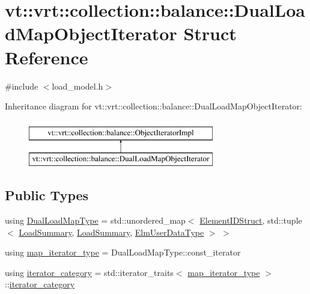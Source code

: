 \hypertarget{structvt_1_1vrt_1_1collection_1_1balance_1_1_dual_load_map_object_iterator}{}\section{vt\+:\+:vrt\+:\+:collection\+:\+:balance\+:\+:Dual\+Load\+Map\+Object\+Iterator Struct Reference}
\label{structvt_1_1vrt_1_1collection_1_1balance_1_1_dual_load_map_object_iterator}


{\ttfamily \#include $<$load\+\_\+model.\+h$>$}

Inheritance diagram for vt\+:\+:vrt\+:\+:collection\+:\+:balance\+:\+:Dual\+Load\+Map\+Object\+Iterator\+:\begin{figure}[H]
\begin{center}
\leavevmode
\includegraphics[height=2.000000cm]{structvt_1_1vrt_1_1collection_1_1balance_1_1_dual_load_map_object_iterator}
\end{center}
\end{figure}
\subsection*{Public Types}
\begin{DoxyCompactItemize}
\item 
using \hyperlink{structvt_1_1vrt_1_1collection_1_1balance_1_1_dual_load_map_object_iterator_a73ef88ce9e6fa24ee9eacc749ef72d03}{Dual\+Load\+Map\+Type} = std\+::unordered\+\_\+map$<$ \hyperlink{namespacevt_1_1vrt_1_1collection_1_1balance_a9f5b53fafb270212279a4757d2c4cd28}{Element\+I\+D\+Struct}, std\+::tuple$<$ \hyperlink{structvt_1_1vrt_1_1collection_1_1balance_1_1_load_summary}{Load\+Summary}, \hyperlink{structvt_1_1vrt_1_1collection_1_1balance_1_1_load_summary}{Load\+Summary}, \hyperlink{namespacevt_1_1vrt_1_1collection_1_1balance_abf9eea0f4c24e41036ab844025e7d4c8}{Elm\+User\+Data\+Type} $>$ $>$
\item 
using \hyperlink{structvt_1_1vrt_1_1collection_1_1balance_1_1_dual_load_map_object_iterator_a86bac54b4dc71af6b0a7cf5aa7ced433}{map\+\_\+iterator\+\_\+type} = Dual\+Load\+Map\+Type\+::const\+\_\+iterator
\item 
using \hyperlink{structvt_1_1vrt_1_1collection_1_1balance_1_1_dual_load_map_object_iterator_a34d41afa8def298d663b106eee78dddf}{iterator\+\_\+category} = std\+::iterator\+\_\+traits$<$ \hyperlink{structvt_1_1vrt_1_1collection_1_1balance_1_1_dual_load_map_object_iterator_a86bac54b4dc71af6b0a7cf5aa7ced433}{map\+\_\+iterator\+\_\+type} $>$\+::\hyperlink{structvt_1_1vrt_1_1collection_1_1balance_1_1_dual_load_map_object_iterator_a34d41afa8def298d663b106eee78dddf}{iterator\+\_\+category}
\end{DoxyCompactItemize}

